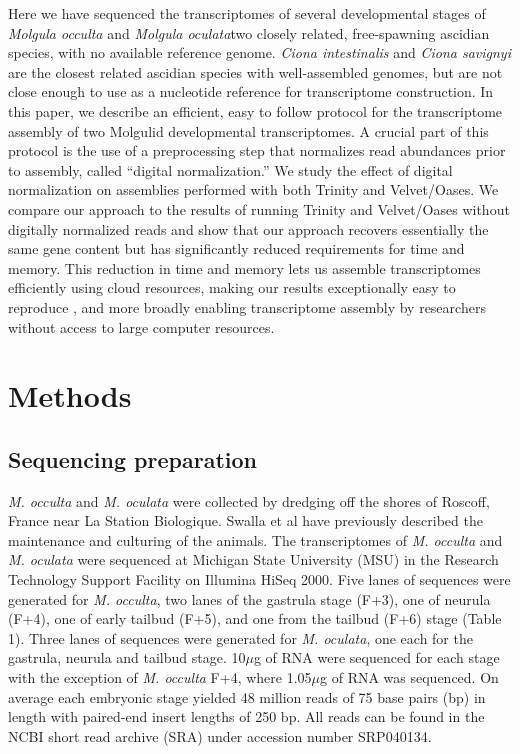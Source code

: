 Here we have sequenced the transcriptomes of several developmental stages of \textit{Molgula occulta} and \textit{Molgula oculata}\textemdash two closely related, free-spawning ascidian species, with no available reference genome. \textit{Ciona intestinalis} and \textit{Ciona savignyi} are the closest related ascidian species with well-assembled genomes, but are not close enough to use as a nucleotide reference for transcriptome construction. In this paper, we describe an efficient, easy to follow protocol for the transcriptome assembly of two Molgulid developmental transcriptomes. A crucial part of this protocol is the use of a preprocessing step that normalizes read abundances prior to assembly, called ``digital normalization.'' We study the effect of digital normalization on assemblies performed with both Trinity and Velvet/Oases.  We compare our approach to the results of running Trinity and Velvet/Oases without digitally normalized reads and show that our approach recovers essentially the same gene content but has significantly reduced requirements for time and memory.  This reduction in time and memory lets us assemble transcriptomes efficiently using cloud resources, making our results exceptionally easy to reproduce \citep{haas_novo_2013}, and more broadly enabling transcriptome assembly by researchers without access to large computer resources.

\section{Methods}
\subsection{Sequencing preparation}
\textit{M. occulta} and \textit{M. oculata} were collected by dredging off the shores of Roscoff, France near La Station Biologique. Swalla et al have previously described the maintenance \citep{swalla_interspecific_1990} and culturing \citep{swalla_multigene_1999} of the animals. The transcriptomes of \textit{M. occulta} and \textit{M. oculata} were sequenced at Michigan State University (MSU) in the Research Technology Support Facility on Illumina HiSeq 2000. Five lanes of sequences were generated for \textit{M. occulta}, two lanes of the gastrula stage (F+3), one of neurula (F+4), one of early tailbud (F+5), and one from the tailbud (F+6) stage (Table 1). Three lanes of sequences were generated for \textit{M. oculata}, one each for the gastrula, neurula and tailbud stage. 10$\mu$g of RNA were sequenced for each stage with the exception of \textit{M. occulta} F+4, where 1.05$\mu$g of RNA was sequenced. On average each embryonic stage yielded 48 million reads of 75 base pairs (bp) in length with paired-end insert lengths of 250 bp. All reads can be found in the NCBI short read archive (SRA) under accession number SRP040134. 

